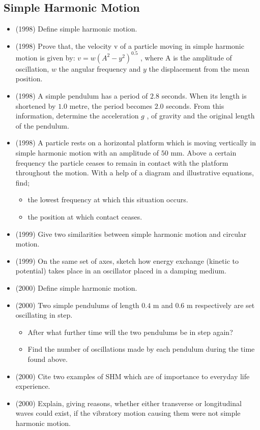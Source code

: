 \documentclass{article}
\begin{document}
\subsection{Simple Harmonic Motion}
\begin{itemize}
\item (1998)  Define simple harmonic motion.
\item (1998)  Prove that, the velocity v of a particle moving in simple harmonic motion is given by: $ v=w(A^{2}-y^{2})^{0.5}$ , where A is the amplitude of oscillation, $ w$ the angular frequency and $ y$ the displacement from the mean position.
\item (1998)  A simple pendulum has a period of $ 2.8$ seconds. When its length is shortened by $ 1.0$ metre, the period becomes $ 2.0$ seconds. From this information, determine the acceleration $ g$ , of gravity and the original length of the pendulum.
\item (1998)  A particle rests on a horizontal platform which is moving vertically in simple harmonic motion with an amplitude of $ 50$ mm. Above a certain frequency the particle ceases to remain in contact with the platform throughout the motion. With a help of a diagram and illustrative equations, find;
 \begin{itemize}
\item the lowest frequency at which this situation occurs.
\item the position at which contact ceases.
\end{itemize}
\item (1999)  Give two similarities between simple harmonic motion and circular motion.
\item (1999)  On the same set of axes, sketch how energy exchange (kinetic to potential) takes place in an oscillator placed in a damping medium.
\item (2000)  Define simple harmonic motion.
\item (2000)  Two simple pendulums of length $ 0.4$ m and $ 0.6$ m respectively are set oscillating in step. 
 \begin{itemize}
\item After what further time will the two pendulums be in step again? 
\item Find the number of oscillations made by each pendulum during the time found above.
\end{itemize}
\item (2000)  Cite two examples of SHM which are of importance to everyday life experience.
\item (2000)  Explain, giving reasons, whether either transverse or longitudinal waves could exist, if the vibratory motion causing them were not simple harmonic motion.

\end{itemize}
\end{document}
